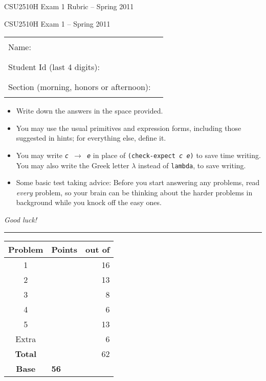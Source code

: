 \documentclass[12pt]{article}                   %
\newcommand\code[1]{\texttt{#1}}
\begin{document}
\vspace*{-1.5cm}
\ifrubric
\centerline{\Large CSU2510H Exam 1 Rubric -- Spring 2011}

\else
\centerline{\Large CSU2510H Exam 1 -- Spring 2011}

\vspace{0.5cm}

\begin{center}
\begin{tabular}{l@{\qquad}l}
Name:                        & \rule{174pt}{1pt} \\[.5cm]
Student Id (last 4 digits):  & \rule{174pt}{1pt} \\[.5cm]
Section (morning, honors or afternoon):           & \rule{174pt}{1pt} \\[.5cm]
\end{tabular}
\end{center}

\noindent\begin{minipage}{7cm}\sloppy
\begin{itemize}
\item Write down the answers in the space provided.

\item You may use the usual primitives and expression forms, including those
suggested in hints; for everything else, define it.

\item You may write {\tt {\slshape c} $\rightarrow$ {\slshape e}} in place of
  {\tt (check-expect {\slshape c e})} to save time writing. 
  You may also write the Greek letter $\lambda$ 
  instead of \code{lambda}, to save writing.


\item Some basic test taking advice: Before you start answering
any problems, read \emph{every} problem, so your brain can be thinking
about the harder problems in background while you knock off the easy ones.
\end{itemize}

\bigskip

\emph{Good luck!}
\end{minipage}\hfil\begin{minipage}[t]{6cm}
\rule{1cm}{0pt}\begin{tabular}{|c|l|@{/}r|}
\hline
{\bf Problem} & Points & out of \\ \hline
1 & & 16\\ \hline
2 & & 13\\ \hline
3 & &  8\\ \hline
4 & &  6\\ \hline
5 & & 13\\ \hline
Extra & & 6\\ \hline
{\bf Total} & & 62 \\ \hline
{\bf Base}  & \multicolumn{2}{l|}{{\bf 56}} \\ \hline
\end{tabular}
\end{minipage}
\end{document}
